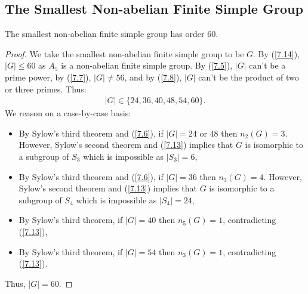 \subsection{The Smallest Non-abelian Finite Simple Group}

The smallest non-abelian finite simple group has order 60.

\begin{proof}
    We take the smallest non-abelian finite simple group to be $G$.
    By (\ref{7.14}), $|G| \leq 60$ as $A_5$ is a non-abelian finite
    simple group.
    By (\ref{7.5}), $|G|$ can't be a prime power, by (\ref{7.7}),
    $|G| \neq 56$, and by (\ref{7.8}), $|G|$ can't be the product
    of two or three primes. Thus: \begin{align*}
        |G| \in \{24, 36, 40, 48, 54, 60\}.
    \end{align*} We reason on a case-by-case basis: \begin{itemize}
        \item By Sylow's third theorem and (\ref{7.6}),
            if $|G| = 24$ or $48$ then $n_2(G) = 3$. However,
            Sylow's second theorem and (\ref{7.13}) implies that
            $G$ is isomorphic to a subgroup of $S_3$ which is
            impossible as $|S_3| = 6$,
        \item By Sylow's third theorem and (\ref{7.6}),
            if $|G| = 36$ then $n_3(G) = 4$. However,
            Sylow's second theorem and (\ref{7.13}) implies that
            $G$ is isomorphic to a subgroup of $S_4$ which is
            impossible as $|S_4| = 24$,
        \item By Sylow's third theorem, if $|G| = 40$ then 
            $n_5(G) = 1$, contradicting (\ref{7.13}),
        \item By Sylow's third theorem, if $|G| = 54$ then 
            $n_3(G) = 1$, contradicting (\ref{7.13}).
    \end{itemize} Thus, $|G| = 60$.
\end{proof}
